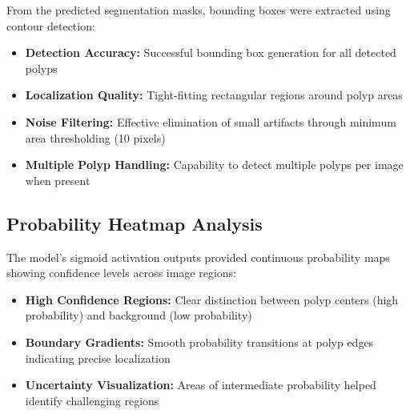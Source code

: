 \documentclass[a4paper,12pt]{report}
\begin{document}
From the predicted segmentation masks, bounding boxes were extracted using contour detection:

\begin{itemize}
    \item \textbf{Detection Accuracy:} Successful bounding box generation for all detected polyps
    \item \textbf{Localization Quality:} Tight-fitting rectangular regions around polyp areas
    \item \textbf{Noise Filtering:} Effective elimination of small artifacts through minimum area thresholding (10 pixels)
    \item \textbf{Multiple Polyp Handling:} Capability to detect multiple polyps per image when present
\end{itemize}

\subsection{Probability Heatmap Analysis}

The model's sigmoid activation outputs provided continuous probability maps showing confidence levels across image regions:

\begin{itemize}
\item \textbf{High Confidence Regions:} Clear distinction between polyp centers (high probability) and background (low probability)
\item \textbf{Boundary Gradients:} Smooth probability transitions at polyp edges indicating precise localization
\item \textbf{Uncertainty Visualization:} Areas of intermediate probability helped identify challenging regions
\end{itemize}
\end{document}

